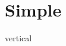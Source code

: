 \documentclass{article}
\begin{document}
\section{Simple}


\begin{stack}{vertical}
\end{stack}
\end{document}
